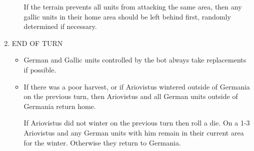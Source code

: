 \begin{enumerate}
\begin{itemize}
    If the terrain prevents all units from attacking the same area, then any gallic units in their home area should be left behind first, randomly determined if necessary.
  \end{itemize}
  
  \item END OF TURN
  \begin{itemize}
    \item German and Gallic units controlled by the bot always take replacements if possible.
    \item If there was a poor harvest, or if Ariovistus wintered outside of Germania on the previous turn, then Ariovistus and all German units outside of Germania return home.
    
    If Ariovistus did not winter on the previous turn then roll a die. On a 1-3 Ariovistus and any German units with him remain in their current area for the winter. Otherwise they return to Germania.
  \end{itemize}
\end{enumerate}

